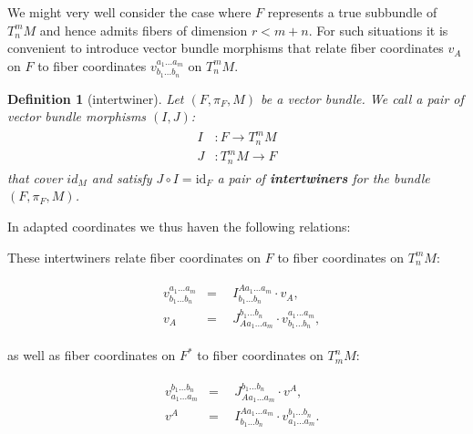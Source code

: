\documentclass[%
 reprint,
nofootinbib,
 amsmath,amssymb,
 aps,
 prd,
floatfix,
]{revtex4-2}
\newtheorem{definition}{Definition}
\begin{document}
\iffalse
i.e., these two sets of coordinate functions satisfy:
\begin{align}
    v^Av_B = \delta^A_B.
\end{align}
\fi

We might very well consider the case where $F$ represents a true subbundle of $T^m_nM$ and hence admits fibers of dimension $r < m+n$. For such situations it is convenient to introduce vector bundle morphisms that relate fiber coordinates $v_A$ on $F$ to fiber coordinates $v^{a_1 ... a_m}_{b_1 ... b_n}$ on $T^m_nM$.

\begin{definition}[intertwiner]\label{interDef}
Let $(F,\pi_F,M)$ be a vector bundle. We call a pair of vector bundle morphisms $(I, J)$:
\begin{align}
    \begin{aligned}
    I&: F \longrightarrow T^m_n M\\
    J&: T^m_n M \longrightarrow F 
    \end{aligned}
\end{align}
that cover $id_M$ and satisfy
$J \circ I = \mathrm{id}_F$ a pair of \textbf{\textit{intertwiners}} for the bundle $(F, \pi_F, M)$.
\end{definition}
In adapted coordinates we thus haven the following relations:

\iffalse
These intertwiners relate fiber coordinates on $F$ to fiber coordinates on $T^m_nM$:

\begin{align} \label{interRel1}
    \begin{aligned}
    & v^{a_1 ... a_m}_{b_1 ... b_n} & = & \ \ I^{A a_1 ... a_m}_{b_1 ... b_n} \cdot v_{A},\\  
    & v_A & = & \ \ J^{b_1 ... b_n}_{A a_1 ... a_m} \cdot v^{a_1 ... a_m}_{b_1 ... b_n},
    \end{aligned}
\end{align}

as well as fiber coordinates on $F^\ast$ to fiber coordinates on $T^n_mM$:

\begin{align} \label{interRel2}
    \begin{aligned}
    & v^{b_1 ... b_n}_{a_1 ... a_m} & = & \ \ J^{b_1 ... b_n}_{A a_1 ... a_m} \cdot v^{A},\\  
    & v^A & = & \ \  I^{A a_1 ... a_m}_{b_1 ... b_n} \cdot v^{b_1 ... b_n}_{a_1 ... a_m}.
    \end{aligned}
\end{align}
\end{document}
